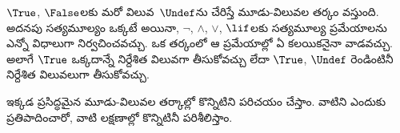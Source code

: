 \documentclass[../../../include/open-logic-section]{subfiles}
\begin{document}


$\True$, $\False$లకు మరో విలువ~$\Undef$ను చేరిస్తే
మూడు-విలువల తర్కం వస్తుంది. అదనపు సత్యమూల్యం ఒక్కటే
అయినా, $\lnot$, $\land$, $\lor$, $\lif$లకు సత్యమూల్య
ప్రమేయాలను ఎన్నో విధాలుగా నిర్వచించవచ్చు. ఒక తర్కంలో
ఆ ప్రమేయాల్లో ఏ కలయికనైనా వాడవచ్చు. అలాగే $\True$ ఒక్కదాన్నే
నిర్దేశిత విలువగా తీసుకోవచ్చు లేదా $\True$, $\Undef$ రెండింటినీ
నిర్దేశిత విలువలుగా తీసుకోవచ్చు.

ఇక్కడ ప్రసిద్ధమైన మూడు-విలువల తర్కాల్లో కొన్నిటిని
పరిచయం చేస్తాం. వాటిని ఎందుకు ప్రతిపాదించారో, వాటి
లక్షణాల్లో కొన్నిటినీ పరిశీలిస్తాం.
\end{document}
